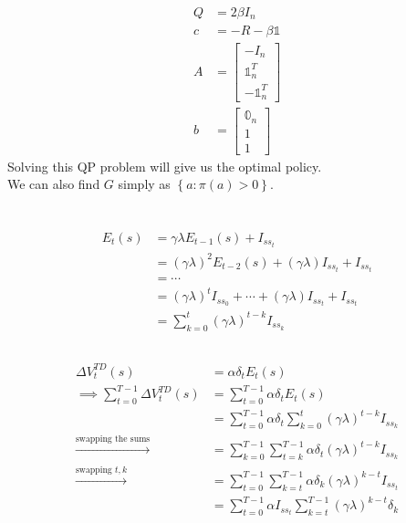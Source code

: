 \documentclass{article}
\begin{document}
\begin{align*}
Q &= 2\beta I_n\\
c &= -R - \beta \mathbb{1}\\
A &= \begin{bmatrix}
    - I_n\\
    \mathbb{1}_n^T\\
    - \mathbb{1}_n^T
\end{bmatrix}\\
b &= \begin{bmatrix}
    \mathbb{0}_n\\
    1\\
    1
\end{bmatrix}
\end{align*}
Solving this QP problem will give us the optimal policy.\\
We can also find \(G\) simply as \(\left\{a: \pi(a) > 0\right\}\).

\section{}
\subsection{}
\begin{align*}
E_t(s) &= \gamma \lambda E_{t-1}(s) + I_{ss_t}\\
&= (\gamma \lambda)^2 E_{t-2}(s) + (\gamma \lambda) I_{ss_t} + I_{ss_t}\\
&= \cdots\\
&= (\gamma \lambda)^t I_{ss_0} + \cdots + (\gamma \lambda) I_{ss_t} + I_{ss_t}\\
&= \sum_{k=0}^{t} (\gamma \lambda)^{t-k} I_{ss_k}
\end{align*}

\subsection{}
\begin{align*}
\Delta V_t^{TD}(s) &= \alpha \delta_t E_t(s)\\
\implies \sum_{t=0}^{T-1} \Delta V_t^{TD}(s) &= \sum_{t=0}^{T-1} \alpha \delta_t E_t(s)\\
&= \sum_{t=0}^{T-1} \alpha \delta_t \sum_{k=0}^{t} (\gamma \lambda)^{t-k} I_{ss_k}\\
\xrightarrow{\text{swapping the sums}} &= \sum_{k=0}^{T-1} \sum_{t=k}^{T-1} \alpha \delta_t (\gamma \lambda)^{t-k} I_{ss_k}\\
\xrightarrow{\text{swapping }t, k} &= \sum_{t=0}^{T-1} \sum_{k=t}^{T-1} \alpha \delta_k (\gamma \lambda)^{k-t} I_{ss_t}\\
&= \sum_{t=0}^{T-1} \alpha I_{ss_t} \sum_{k=t}^{T-1} (\gamma \lambda)^{k-t} \delta_k
\end{align*}
\end{document}
